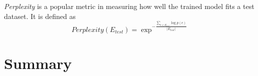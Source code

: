\documentclass[letterpaper]{article}
\begin{document}
\emph{Perplexity} is a popular metric in measuring how well the trained model fits a test dataset.
It is defined as 
\begin{equation}
Perplexity( E_{test} ) = \exp^{- \frac{ \sum_{e \in E_{test}} \log p(e) }{ | E_{test} | } }
\end{equation}


\section{Summary}



\end{document}
